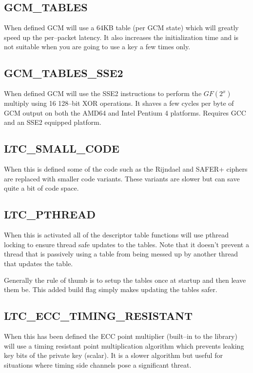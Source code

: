 \documentclass[synpaper]{book}
\begin{document}
\subsection{GCM\_TABLES}
When defined GCM will use a 64KB table (per GCM state) which will greatly speed up the per--packet latency.  
It also increases the initialization time and is not suitable when you are going to use a key a few times only.  

\subsection{GCM\_TABLES\_SSE2}
When defined GCM will use the SSE2 instructions to perform the $GF(2^x)$ multiply using 16 128--bit XOR operations.  It shaves a few cycles per byte
of GCM output on both the AMD64 and Intel Pentium 4 platforms.  Requires GCC and an SSE2 equipped platform.

\subsection{LTC\_SMALL\_CODE}
When this is defined some of the code such as the Rijndael and SAFER+ ciphers are replaced with smaller code variants.
These variants are slower but can save quite a bit of code space.

\subsection{LTC\_PTHREAD}
When this is activated all of the descriptor table functions will use pthread locking to ensure thread safe updates to the tables.  Note that 
it doesn't prevent a thread that is passively using a table from being messed up by another thread that updates the table.

Generally the rule of thumb is to setup the tables once at startup and then leave them be.  This added build flag simply makes updating
the tables safer.

\subsection{LTC\_ECC\_TIMING\_RESISTANT}
When this has been defined the ECC point multiplier (built--in to the library) will use a timing resistant point multiplication
algorithm which prevents leaking key bits of the private key (scalar).  It is a slower algorithm but useful for situations
where timing side channels pose a significant threat.
\end{document}
